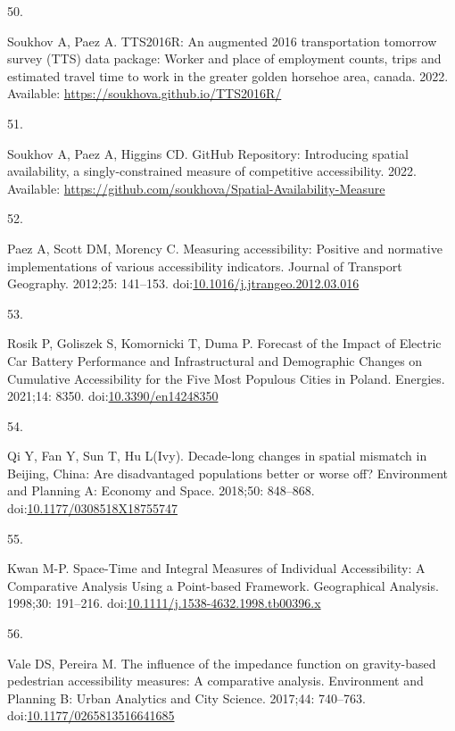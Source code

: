 \documentclass[10pt,letterpaper]{article}
\newlength{\cslhangindent}
\newlength{\csllabelwidth}
\newlength{\cslentryspacingunit} %
\newenvironment{CSLReferences}[2] %
 {%
  \setlength{\parindent}{0pt}
  \ifodd #1
  \let\oldpar\par
  \def\par{\hangindent=\cslhangindent\oldpar}
  \fi
  \setlength{\parskip}{#2\cslentryspacingunit}
 }%
 {}
\newcommand{\CSLLeftMargin}[1]{\parbox[t]{\csllabelwidth}{#1}}
\newcommand{\CSLRightInline}[1]{\parbox[t]{\linewidth - \csllabelwidth}{#1}\break}
\begin{document}
\begin{CSLReferences}{0}{0}
\leavevmode{}%
\CSLLeftMargin{50. }%
\CSLRightInline{Soukhov A, Paez A. TTS2016R: An augmented 2016
transportation tomorrow survey (TTS) data package: Worker and place of
employment counts, trips and estimated travel time to work in the
greater golden horsehoe area, canada. 2022. Available:
\url{https://soukhova.github.io/TTS2016R/}}

\leavevmode{}%
\CSLLeftMargin{51. }%
\CSLRightInline{Soukhov A, Paez A, Higgins CD. {GitHub Repository}:
{Introducing} spatial availability, a singly-constrained measure of
competitive accessibility. 2022. Available:
\url{https://github.com/soukhova/Spatial-Availability-Measure}}

\leavevmode{}%
\CSLLeftMargin{52. }%
\CSLRightInline{Paez A, Scott DM, Morency C. Measuring accessibility:
Positive and normative implementations of various accessibility
indicators. Journal of Transport Geography. 2012;25: 141--153.
doi:\href{https://doi.org/10.1016/j.jtrangeo.2012.03.016}{10.1016/j.jtrangeo.2012.03.016}}

\leavevmode{}%
\CSLLeftMargin{53. }%
\CSLRightInline{Rosik P, Goliszek S, Komornicki T, Duma P. Forecast of
the {Impact} of {Electric} {Car} {Battery} {Performance} and
{Infrastructural} and {Demographic} {Changes} on {Cumulative}
{Accessibility} for the {Five} {Most} {Populous} {Cities} in {Poland}.
Energies. 2021;14: 8350.
doi:\href{https://doi.org/10.3390/en14248350}{10.3390/en14248350}}

\leavevmode{}%
\CSLLeftMargin{54. }%
\CSLRightInline{Qi Y, Fan Y, Sun T, Hu L(Ivy). Decade-long changes in
spatial mismatch in {Beijing}, {China}: {Are} disadvantaged populations
better or worse off? Environment and Planning A: Economy and Space.
2018;50: 848--868.
doi:\href{https://doi.org/10.1177/0308518X18755747}{10.1177/0308518X18755747}}

\leavevmode{}%
\CSLLeftMargin{55. }%
\CSLRightInline{Kwan M-P. Space-{Time} and {Integral} {Measures} of
{Individual} {Accessibility}: {A} {Comparative} {Analysis} {Using} a
{Point}-based {Framework}. Geographical Analysis. 1998;30: 191--216.
doi:\href{https://doi.org/10.1111/j.1538-4632.1998.tb00396.x}{10.1111/j.1538-4632.1998.tb00396.x}}

\leavevmode{}%
\CSLLeftMargin{56. }%
\CSLRightInline{Vale DS, Pereira M. The influence of the impedance
function on gravity-based pedestrian accessibility measures: {A}
comparative analysis. Environment and Planning B: Urban Analytics and
City Science. 2017;44: 740--763.
doi:\href{https://doi.org/10.1177/0265813516641685}{10.1177/0265813516641685}}


\end{CSLReferences}
\end{document}
